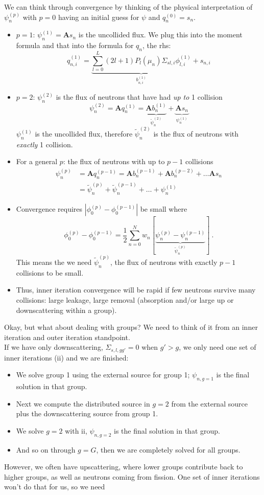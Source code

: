\documentclass[12pt]{article}
\newcommand{\ve}[1]{\ensuremath{\mathbf{#1}}}
\begin{document}
We can think through convergence by thinking of the physical interpretation of $\psi_n^{(p)}$ with $p=0$ having an initial guess for $\psi$ and $q_n^{(0)} = s_n$.
\begin{itemize}
\item $p=1$: $\psi_n^{(1)} = \ve{A} s_n$ is the uncollided flux. We plug this into the moment formula and that into the formula for $q_n$, the rhs:
\[
q_{n,i}^{(1)} = \underbrace{\sum_{l=0}^L (2l+1) P_l(\mu_n) \Sigma_{sl,i} \phi_{l,i}^{(1)}}_{b_{n,i}^{(1)}} + s_{n,i}
\]

\item  $p=2$: $\psi_n^{(2)}$ is the flux of neutrons that have had \textit{up to} 1 collision
\[
\psi_n^{(2)} = \ve{A} q_{n}^{(1)} = \underbrace{\ve{A} b_n^{(1)}}_{\tilde{\psi}_n^{(2)}} + \underbrace{\ve{A}s_n}_{\psi_n^{(1)}}
\]
$\psi_n^{(1)}$ is the uncollided flux, therefore $\tilde{\psi}_n^{(2)}$ is the flux of neutrons with \textit{exactly} 1 collision.

\item For a general $p$: the flux of neutrons with up to $p-1$ collisions
\begin{align*}
\psi_n^{(p)} &= \ve{A} q_{n}^{(p-1)} = \ve{A} b_n^{(p-1)} + \ve{A} b_n^{(p-2)} + \dots \ve{A}s_n\\
&= \tilde{\psi}_n^{(p)} + \tilde{\psi}_n^{(p-1)} + \dots + \psi_n^{(1)}
\end{align*}

\item Convergence requires $|\phi_0^{(p)} - \phi_0^{(p-1)}|$ be small where
\[
\phi_0^{(p)} - \phi_0^{(p-1)} = \frac{1}{2} \sum_{n=0}^N w_n[\underbrace{\psi_n^{(p)} - \psi_n^{(p-1)}}_{\tilde{\psi}_n^{(p)}}] \:.
\]
This means the we need $\tilde{\psi}_n^{(p)}$, the flux of neutrons with exactly $p-1$ collisions to be small.

\item Thus, inner iteration convergence will be rapid if few neutrons survive many collisions: large leakage, large removal (absorption and/or large up or downscattering within a group).
\end{itemize}
%
Okay, but what about dealing with groups? We need to think of it from an inner iteration and outer iteration standpoint.\\
If we have only downscattering, $\Sigma_{s,l,gg'}=0$ when $g' > g$, we only need one set of inner iterations (ii) and we are finished:
% 
\begin{itemize}
\item We solve group 1 using the external source for group 1; $\psi_{n,g=1}$ is the final solution in that group. 
\item Next we compute the distributed source in $g=2$ from the external source plus the downscattering source from group 1. 
\item We solve $g=2$ with ii, $\psi_{n,g=2}$ is the final solution in that group.
\item And so on through $g=G$, then we are completely solved for all groups.
\end{itemize}
%
However, we often have upscattering, where lower groups contribute back to higher groups, as well as neutrons coming from fission. One set of inner iterations won't do that for us, so we need 
\end{document}

